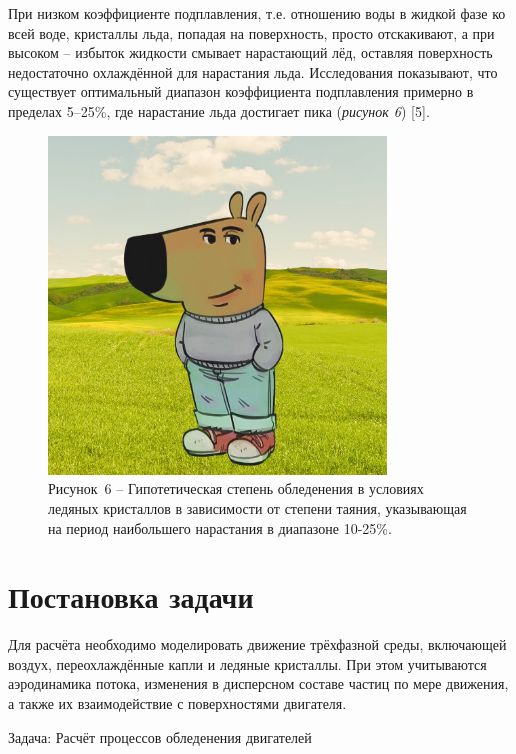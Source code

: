 При низком коэффициенте подплавления, т.е. отношению воды в жидкой фазе ко всей воде, кристаллы льда, попадая на поверхность, просто отскакивают, а при высоком – избыток жидкости смывает нарастающий лёд, оставляя поверхность недостаточно охлаждённой для нарастания льда. Исследования показывают, что существует оптимальный диапазон коэффициента подплавления примерно в пределах 5–25\%, где нарастание льда достигает пика (\textit{рисунок 6}) [5].

\begin{figure}[H]
	\centering
	\includegraphics[width=0.8\textwidth]{figures/chill-guy.jpeg}
	\caption*{Рисунок~6 – Гипотетическая степень обледенения в условиях ледяных кристаллов в зависимости от степени таяния, указывающая на период наибольшего нарастания в диапазоне 10-25\%.}
	\label{fig:-4}
\end{figure}

\section{Постановка задачи}

Для расчёта необходимо моделировать движение трёхфазной среды, включающей воздух, переохлаждённые капли и ледяные кристаллы. При этом учитываются аэродинамика потока, изменения в дисперсном составе частиц по мере движения, а также их взаимодействие с поверхностями двигателя.

Задача: Расчёт процессов обледенения двигателей

